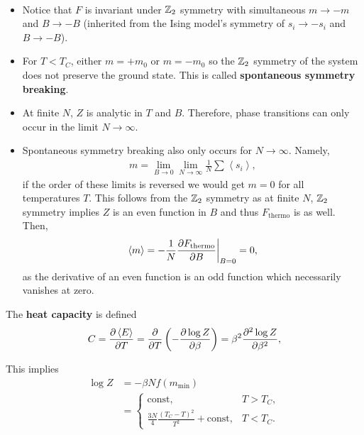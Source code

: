 \begin{notes}~
    \begin{itemize}
        \item Notice that $F$ is invariant under $\mathbb{Z}_2$ symmetry with simultaneous $m \to -m$  and $B \to - B$ (inherited from the Ising model's symmetry of $s_i \to -s_i$ and $B \to -B$).
        \item For $T < T_C$, either $m = + m_0$ or $m = - m_0$ so the $\mathbb{Z}_2$ symmetry of the system does not preserve the ground state. This is called \textbf{spontaneous symmetry breaking}.
        \item At finite $N$, $Z$ is analytic in $T$ and $B$. Therefore, phase transitions can only occur in the limit $N \to \infty$.
        \item Spontaneous symmetry breaking also only occurs for $N \to \infty$. Namely,
            \begin{align}
                m = \lim_{B \to 0} \lim_{N \to \infty} \frac{1}{N} \sum_{}^{} \left<s_{i} \right>
            ,\end{align}
            if the order of these limits is reversed we would get $m = 0$ for all temperatures $T$. This follows from the $\mathbb{Z}_2$ symmetry as at finite $N$, $\mathbb{Z}_2$ symmetry implies $Z$ is an even function in $B$ and thus $F_\text{thermo}$ is as well. Then,
            \begin{align}
                \left<m \right> = -\frac{1}{N} \pdv{F_\text{thermo}}{B} \bigg|_{B=0} = 0
            ,\end{align}
            as the derivative of an even function is an odd function which necessarily vanishes at zero.
    \end{itemize}
\end{notes}


\begin{definition}
    The \textbf{heat capacity} is defined
    \begin{align}
        C = \pdv{ \left<E \right>}{T} = \pdv{T} \left( - \pdv{\log Z}{\beta} \right)  = \beta^2 \pdv[2]{\log Z}{\beta}
    ,\end{align}
\end{definition}

This implies
\begin{align}
    \log Z &= - \beta N f\left( m_\text{min} \right)  \\
    &= \begin{cases}
        \text{const}, & T > T_C, \\
        \frac{3N}{4} \frac{\left( T_C - T \right)^2}{T^2} + \text{const}, & T < T_C.
    \end{cases} 
\end{align}

